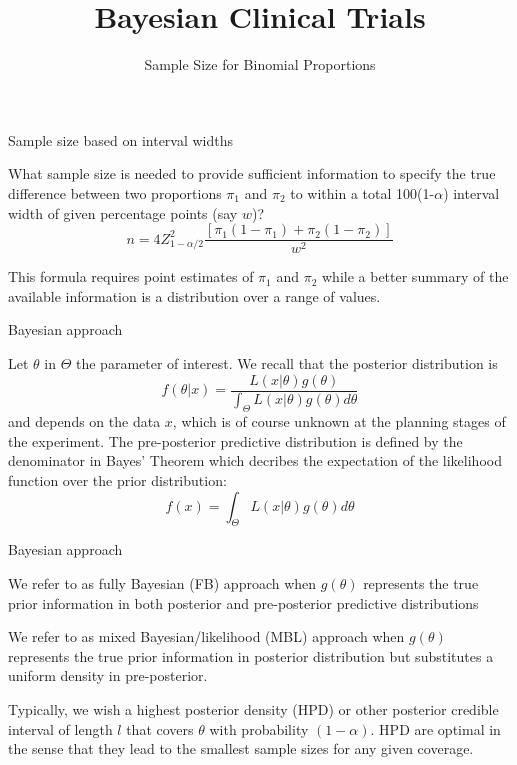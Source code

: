 \documentclass{beamer}
\title[]{Bayesian Clinical Trials}
\subtitle{Sample Size for Binomial Proportions}
\date{}
\begin{document}
\begin{frame}
\titlepage %
\end{frame}


\begin{frame}{Sample size based on interval widths}

What sample size is needed to provide sufficient information to specify
the true difference between two proportions \(\pi_{1}\) and \(\pi_{2}\)
to within a total 100(1-\(\alpha\)) interval width of given percentage
points (say \(w\))? \[
n=4Z_{1-\alpha/2}^2\frac{\left[\pi_{1}\left(1-\pi_{1}\right)+\pi_{2}\left(1-\pi_{2}\right)\right]}{w^2}
\]

This formula requires point estimates of \(\pi_{1}\) and \(\pi_{2}\)
while a better summary of the available information is a distribution
over a range of values.

\end{frame}





\begin{frame}{Bayesian approach}

Let \(\theta\) in \(\Theta\) the parameter of interest. We recall that
the posterior distribution is \[
f\left(\theta\vert x\right)=\frac{L\left(x\vert \theta\right)g\left(\theta\right)}{\int_\Theta L\left(x\vert\theta\right)g\left(\theta\right) d\theta}
\] and depends on the data \(x\), which is of course unknown at the
planning stages of the experiment. The pre-posterior predictive
distribution is defined by the denominator in Bayes' Theorem which
decribes the expectation of the likelihood function over the prior
distribution: \[
f\left(x\right)=\int_\Theta L\left(x\vert \theta\right)g\left(\theta\right) d\theta
\]

\end{frame}



\begin{frame}{Bayesian approach}

We refer to as fully Bayesian (FB) approach when
\(g\left(\theta\right)\) represents the true prior information in both
posterior and pre-posterior predictive distributions

We refer to as mixed Bayesian/likelihood (MBL) approach when
\(g\left(\theta\right)\) represents the true prior information in
posterior distribution but substitutes a uniform density in
pre-posterior.

Typically, we wish a highest posterior density (HPD) or other posterior
credible interval of length \(l\) that covers \(\theta\) with
probability \((1-\alpha)\). HPD are optimal in the sense that they lead
to the smallest sample sizes for any given coverage.

\end{frame}
\end{document}
